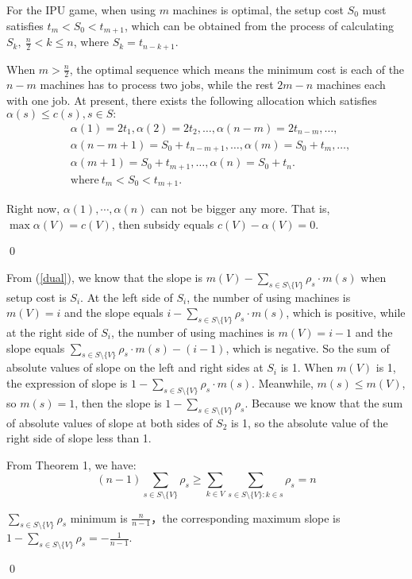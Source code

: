 \begin{pf}[Theorem 3]
For the IPU game, when using $m$ machines is optimal, the setup cost $S_0$ must satisfies $t_m < S_0 < t_{m+1}$, which can be obtained from the process of calculating $S_k,~\frac{n}{2} < k \leq n$, where $S_k = t_{n-k+1}$.

When $m > \frac{n}{2}$, the optimal sequence which means the minimum cost is each of the $n-m$ machines has to process two jobs, while the rest $2m-n$ machines each with one job. At present, there exists the following allocation which satisfies $\alpha(s) \leq c(s), s \in S:$
\[
\begin{aligned}
&\alpha(1)=2t_1,\alpha(2)=2t_2,\ldots,\alpha(n-m)=2t_{n-m},\ldots,\\
&\alpha(n-m+1)=S_0+t_{n-m+1},\ldots,\alpha(m)=S_0+t_{m},\ldots,\\
&\alpha(m+1)=S_0+t_{m+1},\ldots,\alpha(n)=S_0+t_n.\\
&\text{where} \ t_m < S_0 < t_{m+1}.
\end{aligned}
\]

Right now, $\alpha(1),\cdots,\alpha(n)$ can not be bigger any more. That is, $\mathop{max} \alpha(V) = c(V)$, then subsidy equals $c(V)-\alpha(V) = 0$.

\qed
\end{pf}


\begin{pf}[Theorem 4]
From (\ref{dual}), we know that the slope is $m(V)-\sum_{s\in S \setminus\{V\}} \rho_s \cdot m(s)$ when setup cost is $S_i$. At the left side of $S_i$, the number of using machines is $m(V)=i$ and the slope equals $i-\sum_{s\in S \setminus\{V\}} \rho_s \cdot m(s)$, which is positive, while at the right side of $S_i$, the number of using machines is $m(V)=i-1$ and the slope equals $\sum_{s\in S \setminus\{V\}} \rho_s \cdot m(s) - (i-1)$,
which is negative. So the sum of absolute values of slope on the left and right sides at $S_i$ is 1.
When $m(V)$ is 1, the expression of slope is $1-\sum_{s\in S \setminus\{V\}} \rho_s \cdot m(s)$. Meanwhile, $m(s) \leq m(V)$, so $m(s) = 1$, then the slope is $1-\sum_{s\in S \setminus\{V\}} \rho_s $.
Because we know that the sum of absolute values of slope at both sides of $S_2$ is 1, so the absolute value of the right side of slope less than 1.

From Theorem 1, we have:
\begin{displaymath}
    (n-1) \sum_{s \in S \setminus\{V\} } \rho_s \geq
    \sum_{k\in V}\sum_{s \in S \setminus\{V\}:k \in s} \rho_s = n
\end{displaymath}

$\sum_{s \in S \setminus\{V\}} \rho_s $ minimum is $\frac{n}{n-1}$，the corresponding maximum slope is $ 1-\sum_{s\in S \setminus\{V\}} \rho_s =-\frac{1}{n-1}$.

\qed
\end{pf}

